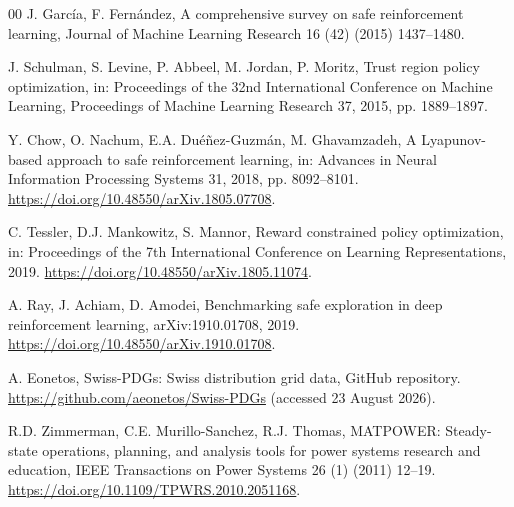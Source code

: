\documentclass[final,5p,times]{elsarticle}
\begin{document}
\begin{thebibliography}{00}
J. Garc\'ia, F. Fern\'andez, A comprehensive survey on safe reinforcement learning, Journal of Machine Learning Research 16 (42) (2015) 1437--1480.

J. Schulman, S. Levine, P. Abbeel, M. Jordan, P. Moritz, Trust region policy optimization, in: Proceedings of the 32nd International Conference on Machine Learning, Proceedings of Machine Learning Research 37, 2015, pp. 1889--1897.

Y. Chow, O. Nachum, E.A. Du\'e\~nez-Guzm\'an, M. Ghavamzadeh, A Lyapunov-based approach to safe reinforcement learning, in: Advances in Neural Information Processing Systems 31, 2018, pp. 8092--8101. \url{https://doi.org/10.48550/arXiv.1805.07708}.

C. Tessler, D.J. Mankowitz, S. Mannor, Reward constrained policy optimization, in: Proceedings of the 7th International Conference on Learning Representations, 2019. \url{https://doi.org/10.48550/arXiv.1805.11074}.

A. Ray, J. Achiam, D. Amodei, Benchmarking safe exploration in deep reinforcement learning, arXiv:1910.01708, 2019. \url{https://doi.org/10.48550/arXiv.1910.01708}.

A. Eonetos, Swiss-PDGs: Swiss distribution grid data, GitHub repository. \url{https://github.com/aeonetos/Swiss-PDGs} (accessed 23 August 2026).

R.D. Zimmerman, C.E. Murillo-Sanchez, R.J. Thomas, MATPOWER: Steady-state operations, planning, and analysis tools for power systems research and education, IEEE Transactions on Power Systems 26 (1) (2011) 12--19. \url{https://doi.org/10.1109/TPWRS.2010.2051168}.

\end{thebibliography}

\balance
\end{document}
